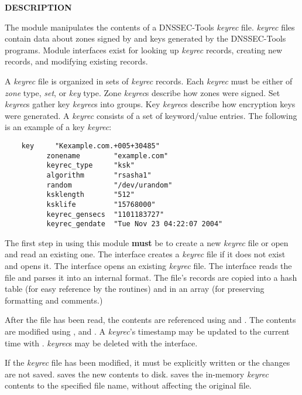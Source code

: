 {\bf DESCRIPTION}

The  module manipulates the contents of
a DNSSEC-Tools {\it keyrec} file.  {\it keyrec} files contain data about
zones signed by and keys generated by the DNSSEC-Tools programs.  Module
interfaces exist for looking up {\it keyrec} records, creating new
records, and modifying existing records.

A {\it keyrec} file is organized in sets of {\it keyrec} records.  Each {\it
keyrec} must be either of {\it zone} type, {\it set}, or {\it key} type.  Zone
{\it keyrec}s describe how zones were signed.  Set {\it keyrec}s gather key
{\it keyrec}s into groups.  Key {\it keyrec}s describe how encryption keys
were generated.  A {\it keyrec} consists of a set of keyword/value entries.
The following is an example of a key {\it keyrec}:

\begin{verbatim}
    key     "Kexample.com.+005+30485"
          zonename        "example.com"
          keyrec_type     "ksk"
          algorithm       "rsasha1"
          random          "/dev/urandom"
          ksklength       "512"
          ksklife         "15768000"
          keyrec_gensecs  "1101183727"
          keyrec_gendate  "Tue Nov 23 04:22:07 2004"
\end{verbatim}

The first step in using this module {\bf must} be to create a new {\it keyrec}
file or open and read an existing one.  The  interface
creates a {\it keyrec} file if it does not exist and opens it.  The
 interface opens an existing {\it keyrec} file.  The
 interface reads the file and parses it into an internal
format.  The file's records are copied into a hash table (for easy reference
by the  routines) and in an array (for
preserving formatting and comments.)

After the file has been read, the contents are referenced using
 and .  The contents
are modified using , and .
A {\it keyrec}'s timestamp may be updated to the current time with
.  {\it keyrec}s may be deleted with the
 interface.

If the {\it keyrec} file has been modified, it must be explicitly written or
the changes are not saved.   saves the new contents to
disk.   saves the in-memory {\it keyrec} contents to the
specified file name, without affecting the original file.

